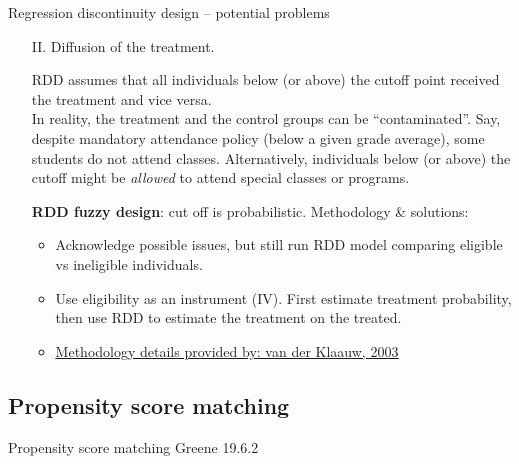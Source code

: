 \documentclass{beamer}
\begin{document}
\begin{frame}{Regression discontinuity design -- potential problems}
\begin{itemize}
    \item[II.] Diffusion of the treatment.\\ \bigskip \small
    
    RDD assumes that all individuals below (or above) the cutoff point received the treatment and vice versa.\\ \smallskip
    In reality, the treatment and the control groups can be ``contaminated''. Say, despite mandatory attendance policy (below a given grade average), some students do not attend classes. Alternatively, individuals below (or above) the cutoff might be \textit{allowed} to attend special classes or programs. \\ \medskip

    \textbf{RDD fuzzy design}: cut off is probabilistic. Methodology \& solutions:\\

    \begin{itemize}
        \item Acknowledge possible issues, but still run RDD model comparing eligible vs ineligible individuals.
        \item Use eligibility as an instrument (IV). First estimate treatment probability, then use RDD to estimate the treatment on the treated.
        \item \textcolor{blue}{\underline{\href{https://onlinelibrary.wiley.com/doi/10.1111/1468-2354.t01-1-00055}{Methodology details provided by: van der Klaauw, 2003}}}
    \end{itemize}


\end{itemize}
\end{frame}

\subsection{Propensity score matching}
\begin{frame}{Propensity score matching}
    Greene 19.6.2
\end{frame}
\end{document}
